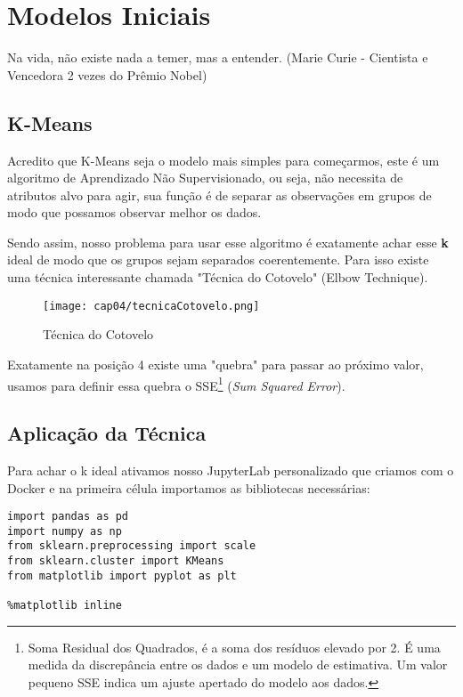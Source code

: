 \chapter{Modelos Iniciais}

\begin{remark}
Na vida, não existe nada a temer, mas a entender. (Marie Curie - Cientista e Vencedora 2 vezes do Prêmio Nobel) 
\end{remark}

\section{K-Means}
Acredito que K-Means seja o modelo mais simples para começarmos, este é um algoritmo de Aprendizado Não Supervisionado, ou seja, não necessita de atributos alvo para agir, sua função é de separar as observações em grupos de modo que possamos observar melhor os dados.

Sendo assim, nosso problema para usar esse algoritmo é exatamente achar esse \textbf{k} ideal de modo que os grupos sejam separados coerentemente. Para isso existe uma técnica interessante chamada "Técnica do Cotovelo" (Elbow Technique).
\begin{figure}[H]
	\centering
	\texttt{[image: cap04/tecnicaCotovelo.png]}
	\caption{Técnica do Cotovelo}
\end{figure}

Exatamente na posição 4 existe uma "quebra" para passar ao próximo valor, usamos para definir essa quebra o SSE\footnote{Soma Residual dos Quadrados, é a soma dos resíduos elevado por 2. É uma medida da discrepância entre os dados e um modelo de estimativa. Um valor pequeno SSE indica um ajuste apertado do modelo aos dados.} (\textit{Sum Squared Error}).

\section{Aplicação da Técnica}

Para achar o k ideal ativamos nosso JupyterLab personalizado que criamos com o Docker e na primeira célula importamos as bibliotecas necessárias:
\begin{lstlisting}[]
import pandas as pd
import numpy as np
from sklearn.preprocessing import scale
from sklearn.cluster import KMeans
from matplotlib import pyplot as plt

%matplotlib inline
\end{lstlisting}

